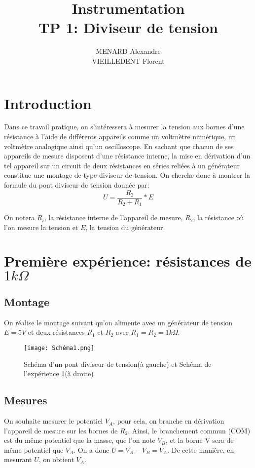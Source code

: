 \documentclass[10pt]{article}
\title{\textbf{Instrumentation} \\ TP 1: Diviseur de tension}
\author{MENARD Alexandre \\ VIEILLEDENT Florent}
\begin{document}
\maketitle

\section*{Introduction}
Dans ce travail pratique, on s'intéressera à mesurer la tension aux bornes d'une résistance à l'aide de différents appareils 
comme un voltmètre numérique, un voltmètre analogique ainsi qu'un oscilloscope. En sachant que chacun de ses appareils de mesure
disposent d'une résistance interne, la mise en dérivation d'un tel appareil sur un circuit de deux résistances en séries reliées à 
un générateur constitue une montage de type diviseur de tension. On cherche donc à montrer la formule du pont diviseur de tension 
donnée par:
\begin{equation}
    U = \frac{R_2}{R_2 + R_1} * E
    \label{eqn:diviseur_tension}
\end{equation}

On notera $R_i$, la résistance interne de l'appareil de mesure, $R_2$, la résistance où l'on mesure la tension et $E$, la tension du 
générateur.

\section{Première expérience: résistances de $1k \Omega$}
\subsection{Montage}

On réalise le montage suivant qu'on alimente avec un générateur de tension $E=5V$ et deux résistances $R_1$ et $R_2$ avec $R_1=R_2=1k\Omega$.

\begin{figure}[!htbp]
    \begin{center}
       \texttt{[image: Schéma1.png]}
        \label{fig:schema1}
        \caption{Schéma d'un pont diviseur de tension(à gauche) et Schéma de l'expérience 1(à droite)}
    \end{center}
\end{figure}

\newpage
\subsection{Mesures}
On souhaite mesurer le potentiel $V_A$, pour cela, on branche en dérivation l'appareil de mesure sur les bornes de $R_2$. Ainsi, 
le branchement commun (COM) est du même potentiel que la masse, que l'on note $V_B$, et la borne V sera de même potentiel 
que $V_A$. On a donc $U = V_A - V_B = V_A$. De cette manière, en mesurant $U$, on obtient $V_A$.
\end{document}
